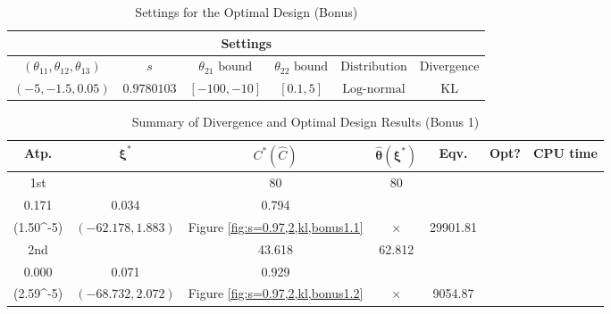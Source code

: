\documentclass[12pt, a4paper]{article}
\begin{document}
\begin{table}[H]
\centering
\renewcommand{\arraystretch}{1.5} %
\setlength{\tabcolsep}{12pt} %
\begin{tabular}{|c|c|c|c|c|c|}
\hline
\multicolumn{6}{|c|}{\textbf{Settings}} \\ 
\hline
\((\theta_{11}, \theta_{12}, \theta_{13})\) & \(s\) & \(\theta_{21} \text{ bound}\) & \(\theta_{22} \text{ bound}\) & \(\text{Distribution}\) & Divergence \\
\hline
\((-5, -1.5, 0.05)\) & \(0.9780103\) & \([-100, -10]\) & \([0.1, 5]\) & \(\text{Log-normal}\) & KL\\
\hline
\end{tabular}
\caption{Settings for the Optimal Design (Bonus)}
\label{tab:Bonus1}
\end{table}

\begin{table}[H]
\centering
\renewcommand{\arraystretch}{1.5} %
\setlength{\tabcolsep}{8pt} %
\begin{tabular}{|c|c|c|c|c|c|c|}
\hline
\textbf{Atp.} & \(\boldsymbol{\xi^*}\) & \(C^* (\hat{C})\) & \(\boldsymbol{\hat{\theta}(\xi^*)}\) & \textbf{Eqv.} & \textbf{Opt?} & \textbf{CPU time} \\
\hline
1st & \(\left\{\begin{array}{ccc}
58.383 & 80 & 80 \\
0.171 & 0.034 & 0.794
\end{array}\right\}\) &
\(\begin{array}{c}
0.851 \\
(1.50\times 10^{-5})
\end{array}\) & 
\((-62.178, 1.883)\) & 
Figure \ref{fig:s=0.97,2,kl,bonus1.1} & $\times$ & 29901.81 \\
\hline
2nd & \(\left\{\begin{array}{ccc}
16.641 & 43.618 & 62.812 \\
0.000 & 0.071 & 0.929
\end{array}\right\}\) &
\(\begin{array}{c}
0.424 \\
(2.59\times 10^{-5})
\end{array}\) & 
\((-68.732, 2.072)\) & 
Figure \ref{fig:s=0.97,2,kl,bonus1.2} & $\times$ & 9054.87 \\
\hline
\end{tabular}
\caption{Summary of Divergence and Optimal Design Results (Bonus 1)}
\label{tab:bonus_results1}
\end{table}
\end{document}
